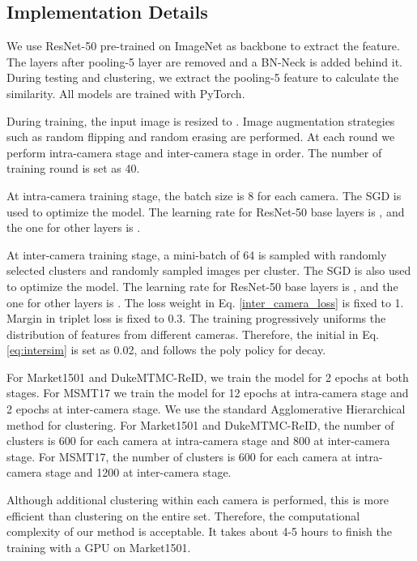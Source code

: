 \documentclass[final]{cvpr}
\begin{document}
\subsection{Implementation Details}
We use ResNet-50 \cite{resnet} pre-trained on ImageNet \cite{imagenet} as backbone to extract the feature. The layers after pooling-5 layer are removed and a BN-Neck \cite{LuoSB} is added behind it. During testing and clustering, we extract the pooling-5 feature to calculate the similarity.
All models are trained with PyTorch.

During training, the input image is resized to . Image augmentation strategies such as random flipping and random erasing are performed. At each round we perform intra-camera stage and inter-camera stage in order. The number of training round is set as 40.

At intra-camera training stage, the batch size is 8 for each camera. The SGD is used to optimize the model. The learning rate for ResNet-50 base layers is , and the one for other layers is .

At inter-camera training stage, a mini-batch of 64 is sampled with  randomly selected clusters and  randomly sampled images per cluster. The SGD is also used to optimize the model. The learning rate for ResNet-50 base layers is , and the one for other layers is . The loss weight  in Eq. \eqref{inter_camera_loss} is fixed to 1. Margin in triplet loss is fixed to 0.3. The training progressively uniforms the distribution of features from different cameras. Therefore, the initial  in Eq. \eqref{eq:intersim} is set as 0.02, and follows the poly policy for decay.

For Market1501 and DukeMTMC-ReID, we train the model for 2 epochs at both stages. For MSMT17 we train the model for 12 epochs at intra-camera stage and 2 epochs at inter-camera stage.
We use the standard Agglomerative Hierarchical method \cite{scikit-learn} for clustering. For Market1501 and DukeMTMC-ReID, the number of clusters is 600 for each camera at intra-camera stage and 800 at inter-camera stage. For MSMT17, the number of clusters is 600 for each camera at intra-camera stage and 1200 at inter-camera stage.

Although additional clustering within each camera is performed, this is more efficient than clustering on the entire set. Therefore, the computational complexity of our method is acceptable. It takes about 4-5 hours to finish the training with a GPU on Market1501. 
\end{document}
